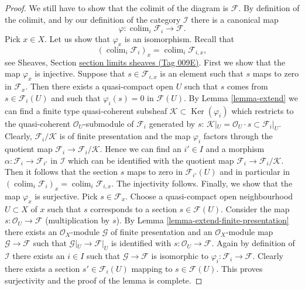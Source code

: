 \documentclass{amsart}
\theoremstyle{plain}
\theoremstyle{definition}
\theoremstyle{remark}
\numberwithin{equation}{subsection}
\def\colim{\mathop{\mathrm{colim}}\nolimits}
\def\Ker{\mathop{\mathrm{Ker}}}
\begin{document}
\begin{proof}
\medskip\noindent
We still have to show that the colimit of the diagram is $\mathcal{F}$.
By definition of the colimit, and by our definition of the category
$\mathcal{I}$ there is a canonical map
$$
\varphi :
\colim_i \mathcal{F}_i
\longrightarrow
\mathcal{F}.
$$
Pick $x \in X$. Let us show that $\varphi_x$ is an isomorphism.
Recall that
$$
(\colim_i \mathcal{F}_i)_x
=
\colim_i \mathcal{F}_{i, x},
$$
see
Sheaves, Section \href{https://stacks.math.columbia.edu/tag/009E}{section limits sheaves (Tag 009E)}.
First we show that the map $\varphi_x$ is injective.
Suppose that $s \in \mathcal{F}_{i, x}$ is an element
such that $s$ maps to zero in $\mathcal{F}_x$. Then there exists
a quasi-compact open $U$ such that $s$ comes from $s \in \mathcal{F}_i(U)$
and such that $\varphi_i(s) = 0$ in $\mathcal{F}(U)$.
By Lemma \ref{lemma-extend}
we can find a finite type quasi-coherent subsheaf
$\mathcal{K} \subset \Ker(\varphi_i)$ which restricts to
the quasi-coherent $\mathcal{O}_U$-submodule of $\mathcal{F}_i$
generated by $s$:
$\mathcal{K}|_U = \mathcal{O}_U\cdot s \subset \mathcal{F}_i|_U$.
Clearly, $\mathcal{F}_i/\mathcal{K}$ is of finite presentation and
the map $\varphi_i$ factors through the quotient map
$\mathcal{F}_i \to \mathcal{F}_i/\mathcal{K}$. Hence we can find
an $i' \in I$ and a morphism $\alpha : \mathcal{F}_i \to \mathcal{F}_{i'}$
in $\mathcal{I}$ which can be identified with the quotient map
$\mathcal{F}_i \to \mathcal{F}_i/\mathcal{K}$. Then it follows
that the section $s$ maps to zero in $\mathcal{F}_{i'}(U)$ and
in particular in
$(\colim_i \mathcal{F}_i)_x =
\colim_i \mathcal{F}_{i, x}$.
The injectivity follows.
Finally, we show that the map $\varphi_x$ is surjective.
Pick $s \in \mathcal{F}_x$. Choose a quasi-compact open neighbourhood
$U \subset X$ of $x$ such that $s$ corresponds to a section
$s \in \mathcal{F}(U)$. Consider the map
$s : \mathcal{O}_U \to \mathcal{F}$ (multiplication by $s$).
By Lemma \ref{lemma-extend-finite-presentation}
there exists an $\mathcal{O}_X$-module $\mathcal{G}$
of finite presentation and an $\mathcal{O}_X$-module map
$\mathcal{G} \to \mathcal{F}$ such that $\mathcal{G}|_U \to \mathcal{F}|_U$
is identified with
$s : \mathcal{O}_U \to \mathcal{F}$.
Again by definition of $\mathcal{I}$ there exists an $i \in I$
such that $\mathcal{G} \to \mathcal{F}$ is isomorphic to
$\varphi_i : \mathcal{F}_i \to \mathcal{F}$. Clearly there exists
a section $s' \in \mathcal{F}_i(U)$ mapping to $s \in \mathcal{F}(U)$.
This proves surjectivity and the proof of the lemma is complete.
\end{proof}
\end{document}
